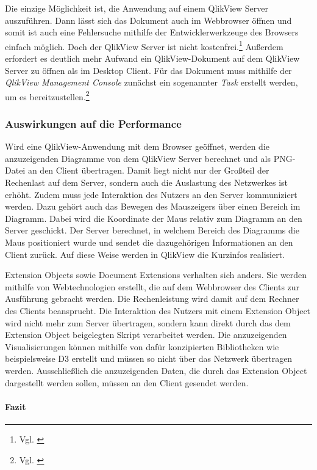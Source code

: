 Die einzige Möglich\-keit ist, die Anwendung auf einem QlikView Server auszuführen. Dann lässt sich das Dokument auch im Webbrowser öffnen und somit ist auch eine Fehler\-suche mithilfe der Entwickler\-werkzeuge des Browsers einfach möglich. Doch der QlikView Server ist nicht kostenfrei.\footnote{Vgl. \cite[S. 16 f.]{redmond2014qlikview}} Außerdem erfordert es deutlich mehr Aufwand ein QlikView-Dokument auf dem QlikView Server zu öffnen als im Desktop Client. Für das Dokument muss mithilfe der \textit{QlikView Management Console} zunächst ein sogenannter \textit{Task} erstellt werden, um es bereitzustellen.\footnote{Vgl. \cite[S. 111 ff.]{redmond2014qlikview}}

\newpage
\subsubsection{Auswirkungen auf die Performance}

Wird eine QlikView-Anwendung mit dem Browser geöffnet, werden die anzuzeigenden Diagramme von dem QlikView Server berechnet und als PNG-Datei an den Client übertragen. Damit liegt nicht nur der Großteil der Rechenlast auf dem Server, sondern auch die Aus\-last\-ung des Netzwerkes ist erhöht. Zudem muss jede Interaktion des Nutzers an den Server kommuniziert werden. Dazu gehört auch das Bewegen des Mauszeigers über einen Bereich im Diagramm. Dabei wird die Koordinate der Maus relativ zum Diagramm an den Server geschickt. Der Server berechnet, in welchem Bereich des Diagramms die Maus positioniert wurde und sendet die dazugehörigen Informationen an den Client zurück. Auf diese Weise werden in QlikView die Kurzinfos realisiert.

Extension Objects sowie Document Extensions verhalten sich anders. Sie werden mithilfe von Webtechnologien erstellt, die auf dem Webbrowser des Clients zur Ausführung gebracht werden. Die Rechenleistung wird damit auf dem Rechner des Clients beansprucht. Die Interaktion des Nutzers mit einem Extension Object wird nicht mehr zum Server übertragen, sondern kann direkt durch das dem Extension Object beigelegten Skript verarbeitet werden. Die anzuzeigenden Visualisierungen können mithilfe von dafür konzipierten Bibliotheken wie beispielsweise D3 erstellt und müssen so nicht über das Netzwerk übertragen werden. Ausschließlich die anzuzeigenden Daten, die durch das Extension Object dargestellt werden sollen, müssen an den Client gesendet werden.

\paragraph{Fazit}

